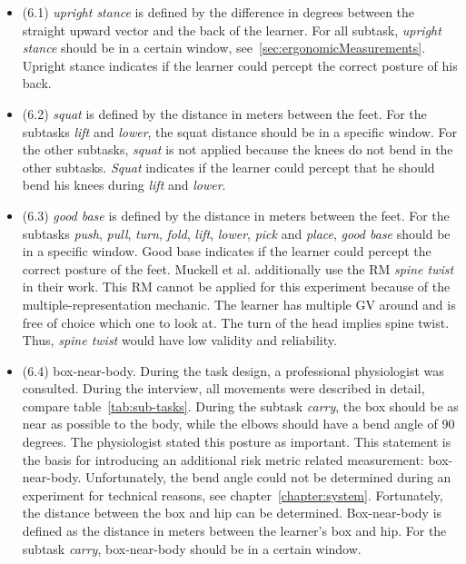 \begin{itemize}
	\item[] (6.1) \textit{upright stance} is defined by the difference in degrees between the straight upward vector and the back of the learner. For all subtask, \textit{upright stance} should be in a certain window, see~\ref{sec:ergonomicMeasurements}. Upright stance indicates if the learner could percept the correct posture of his back.
	
	\item[] (6.2) \textit{squat} is defined by the distance in meters between the feet. For the subtasks \textit{lift} and \textit{lower}, the squat distance should be in a specific window. For the other subtasks, \textit{squat} is not applied because the knees do not bend in the other subtasks. \textit{Squat} indicates if the learner could percept that he should bend his knees during \textit{lift} and \textit{lower}.
	
	\item[] (6.3) \textit{good base} is defined by the distance in meters between the feet. For the subtasks \textit{push}, \textit{pull}, \textit{turn}, \textit{fold}, \textit{lift}, \textit{lower}, \textit{pick} and \textit{place}, \textit{good base} should be in a specific window. Good base indicates if the learner could percept the correct posture of the feet.
	Muckell et al.\cite{muckell} additionally use the RM \textit{spine twist} in their work. This RM cannot be applied for this experiment because of the multiple-representation mechanic. The learner has multiple GV around and is free of choice which one to look at. The turn of the head implies spine twist. Thus, \textit{spine twist} would have low validity and reliability.
	
	\item[] (6.4) box-near-body. During the task design, a professional physiologist was consulted. During the interview, all movements were described in detail, compare table~\ref{tab:sub-tasks}. During the subtask \textit{carry}, the box should be as near as possible to the body, while the elbows should have a bend angle of 90 degrees. The physiologist stated this posture as important. This statement is the basis for introducing an additional risk metric related measurement: box-near-body. Unfortunately, the bend angle could not be determined during an experiment for technical reasons, see chapter~\ref{chapter:system}. Fortunately, the distance between the box and hip can be determined. Box-near-body is defined as the distance in meters between the learner's box and hip. For the subtask \textit{carry}, box-near-body should be in a certain window.
\end{itemize}

